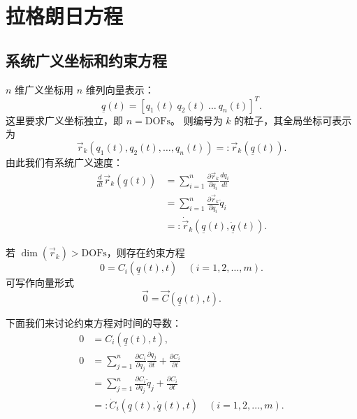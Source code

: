 \chapter{拉格朗日方程}
\section{系统广义坐标和约束方程}
\( n \) 维广义坐标用 \( n \) 维列向量表示：
\[
\underline{q}(t) = [q_1(t) \ q_2(t) \ \dots \ q_n(t)]^T.
\]
这里要求广义坐标独立，即 \( n = \text{DOFs} \)。
则编号为 \( k \) 的粒子，其全局坐标可表示为
\[
\vec{r}_k(q_1(t), q_2(t), \dots, q_n(t)) =: \vec{r}_k(\underline{q}(t)).
\]
由此我们有系统广义速度：
\[
\begin{aligned}
\frac{d}{dt} \vec{r}_k(\underline{q}(t)) &= \sum_{i=1}^n \frac{\partial \vec{r}_k}{\partial q_i} \frac{d q_i}{dt} \\
&= \sum_{i=1}^n \frac{\partial \vec{r}_k}{\partial q_i} \dot{q}_i \\
&=: \dot{\vec{r}}_k(\underline{q}(t), \dot{\underline{q}}(t)).
\end{aligned}
\]

若 \( \dim(\vec{r}_k) > \text{DOFs} \)，则存在约束方程
\[
0 = C_i(\underline{q}(t), t) \quad (i=1,2,\dots,m).
\]
可写作向量形式
\[
\vec{0} = \vec{C}(\underline{q}(t), t).
\]

下面我们来讨论约束方程对时间的导数：
\[
\begin{aligned}
0 &= C_i(\underline{q}(t), t), \\
0 &= \sum_{j=1}^n \frac{\partial C_i}{\partial q_j} \frac{\partial q_j}{\partial t} + \frac{\partial C_i}{\partial t} \\
&= \sum_{j=1}^n \frac{\partial C_i}{\partial q_j} \dot{q}_j + \frac{\partial C_i}{\partial t} \\
&=: \dot{C}_i(\underline{q}(t), \dot{\underline{q}}(t), t) \quad (i=1,2,\dots,m).
\end{aligned}
\]

